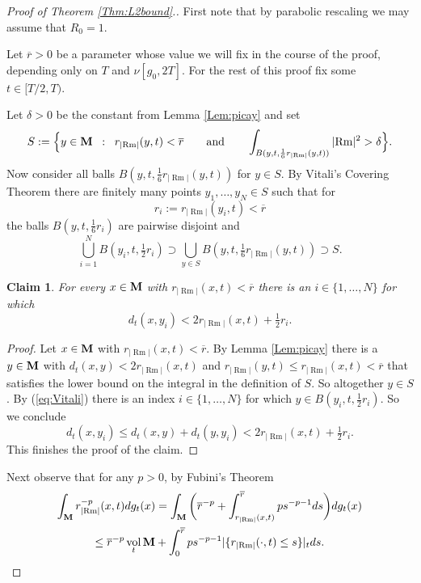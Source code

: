 \documentclass[11pt]{amsart}
\numberwithin{equation}{section}
\newtheorem*{claim}{Claim}
\def\M{{\bf M}}
\DeclareMathOperator{\Rm}{Rm}
\DeclareMathOperator{\vol}{vol}
\newcommand{\rrm}{r_{|{\Rm}|}}
\numberwithin{equation}{section}
\begin{document}
\begin{proof}[Proof of Theorem \ref{Thm:L2bound}.]
First note that by parabolic rescaling we may assume that $R_0 = 1$.

Let $\overline{r} > 0$ be a parameter whose value we will fix in the course of the proof, depending only on $T$ and $\nu [ g_0, 2T ]$.
For the rest of this proof fix some $t \in [T/2, T)$.

Let $\delta > 0$ be the constant from Lemma \ref{Lem:picay} and set
\[ S := \Big\{ y \in \M \;\; : \;\; \rrm (y,t) < \overline{r} \qquad \text{and} \qquad \int_{B(y, t, \frac16 \rrm (y,t))} |{\Rm}|^2 > \delta \Big\}. \]
Now consider all balls $B(y, t, \frac16 \rrm (y,t))$ for $y \in S$.
By Vitali's Covering Theorem there are finitely many points $y_1, \ldots, y_N \in S$ such that for
\[ r_i := \rrm (y_i, t) < \overline{r} \]
the balls $B(y, t, \tfrac16 r_i)$ are pairwise disjoint and
\begin{equation} \label{eq:Vitali}
 \bigcup_{i=1}^N B(y_i, t, \tfrac12 r_i) \supset \bigcup_{y \in S} B(y, t, \tfrac16 \rrm (y,t)) \supset S.
\end{equation}

\begin{claim}
For every $x \in \M$ with $\rrm (x,t) < \overline{r}$ there is an $i \in \{ 1, \ldots, N \}$ for which
\[ d_t (x, y_i) < 2 \rrm (x,t) + \tfrac12 r_i. \]
\end{claim}

\begin{proof}
Let $x \in \M$ with $\rrm (x,t) < \overline{r}$.
By Lemma \ref{Lem:picay} there is a $y \in \M$ with $d_t (x,y) < 2 \rrm(x,t)$ and $\rrm (y,t) \leq \rrm (x,t) < \overline{r}$ that satisfies the lower bound on the integral in the definition of $S$.
So altogether $y \in S$.
By (\ref{eq:Vitali}) there is an index $i \in \{ 1, \ldots, N \}$ for which $y \in B(y_i, t, \tfrac12 r_i)$.
So we conclude
\[ d_t (x, y_i) \leq d_t (x, y) + d_t( y, y_i) < 2 \rrm (x,t) + \tfrac12 r_i. \]
This finishes the proof of the claim.
\end{proof}

Next observe that for any $p > 0$, by Fubini's Theorem
\begin{multline} \label{eq:coareaformu}
 \int_{\M} \rrm^{-p} (x, t) dg_t(x) = \int_{\M} \bigg( \overline{r}^{-p} + \int_{\rrm (x, t)}^{\overline{r}} p s^{-p-1}   ds  \bigg) dg_t(x) \\
 \leq \overline{r}^{-p} \vol_t \M + \int_0^{\overline{r}} p s^{-p-1} | \{ \rrm (\cdot, t) \leq s \} |_t  ds.
\end{multline}


\end{proof}
\end{document}

